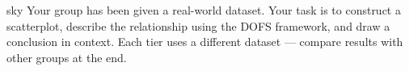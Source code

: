 \documentclass[10pt]{article}
\begin{document}
\namepartnerperiod

\vspace{0.18in}

\begin{scenariobox}[Context]{sky}
\small
Your group has been given a real-world dataset. Your task is to construct a scatterplot,
describe the relationship using the DOFS framework, and draw a conclusion in context.
Each tier uses a different dataset --- compare results with other groups at the end.
\end{scenariobox}

\vspace{0.12in}

\end{document}
